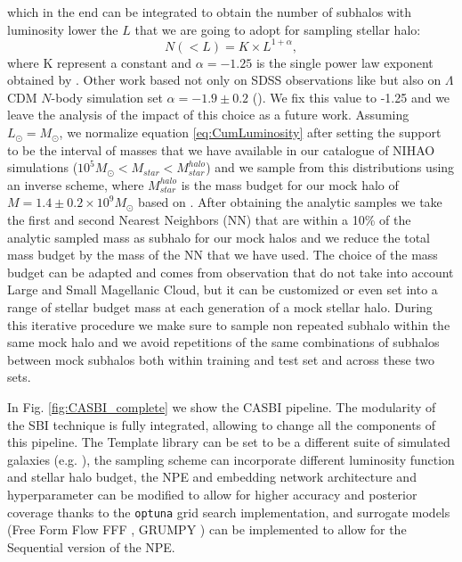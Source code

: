 which in the end can be integrated to obtain the number of subhalos with luminosity lower the $L$ that we are going to adopt for sampling stellar halo:
\begin{equation}
    N(<L) = K \times L^{1+\alpha},
\label{eq:CumLuminosity}
\end{equation}
where K represent a constant and $\alpha=-1.25$ is the single power law exponent obtained by \cite{koposovLuminosityFunctionMilky2008}. Other work based not only on SDSS observations like \cite{koposovLuminosityFunctionMilky2008} but also on $\Lambda$CDM $N$-body simulation set $\alpha = -1.9 \pm 0.2$ (\cite{tollerudHundredsMilkyWay2008}). We fix this value to -1.25 and we leave the analysis of the impact of this choice as a future work.
Assuming $L_\odot = M_\odot$, we normalize equation \ref{eq:CumLuminosity} after setting the support to be the interval of masses that we have available in our catalogue of NIHAO simulations ($10^5 M_\odot < M_{star} < M_{star}^{halo}$) and we sample from this distributions using an inverse scheme, where $ M_{star}^{halo}$ is the mass budget for our mock halo of $M=1.4 \pm 0.2 \times 10^9 M_\odot$ based on \cite{deasonTotalStellarHalo2019}. After obtaining the analytic samples we take the first and second Nearest Neighbors (NN) that are within a 10\% of the analytic sampled mass as subhalo for our mock halos and we reduce the total mass budget by the mass of the NN that we have used. The choice of the mass budget can be adapted and comes from observation that do not take into account Large and Small Magellanic Cloud, but it can be customized or even set into a range of stellar budget mass at each generation of a mock stellar halo. During this iterative procedure we make sure to sample non repeated subhalo within the same mock halo and we avoid repetitions of the same combinations of subhalos between mock subhalos both within training and test set and across these two sets.

In Fig. \ref{fig:CASBI_complete} we show the CASBI pipeline. The modularity of the SBI technique is fully integrated, allowing to change all the components of this pipeline. The Template library can be set to be a different suite of simulated galaxies (e.g. \cite{pillepichMilkyWayAndromeda2023}), the sampling scheme can incorporate different luminosity function and stellar halo budget, the NPE and embedding network architecture and hyperparameter can be modified to allow for higher accuracy and posterior coverage thanks to the \texttt{optuna} grid search implementation, and surrogate models (Free Form Flow FFF \cite{draxlerFreeformFlowsMake2024}, GRUMPY \cite{kravtsovGRUMPYSimpleFramework2022}) can be implemented to allow for the Sequential version of the NPE.      


